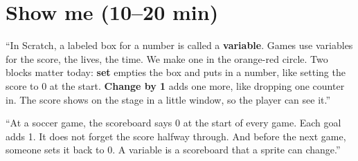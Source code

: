 \section{Show me (10--20 min)}
\begin{teacherscript}
\enquote{In Scratch, a labeled box for a number is called a \textbf{variable}. Games use variables for the score, the lives, the time. We make one in the orange-red  circle. Two blocks matter today: \textbf{set} empties the box and puts in a number, like setting the score to 0 at the start. \textbf{Change by 1} adds one more, like dropping one counter in. The score shows on the stage in a little window, so the player can see it.}
\end{teacherscript}

\begin{analogy}[A scoreboard]
\enquote{At a soccer game, the scoreboard says 0 at the start of every game. Each goal adds 1. It does not forget the score halfway through. And before the next game, someone sets it back to 0. A variable is a scoreboard that a sprite can change.}
\end{analogy}

